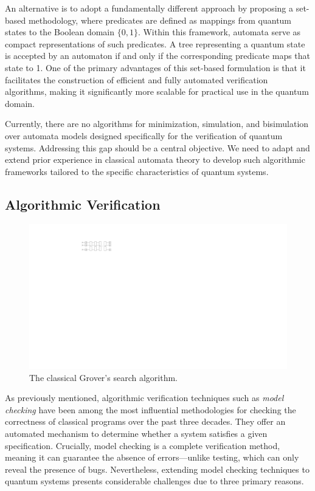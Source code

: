 An alternative is to adopt a fundamentally different approach by proposing a set-based methodology, where predicates are defined as mappings from quantum states to the Boolean domain $\{0,1\}$.
%
Within this framework, automata serve as compact representations of such predicates. A tree representing a quantum state is accepted by an automaton if and only if the corresponding predicate maps that state to 1.
%
One of the primary advantages of this set-based formulation is that it facilitates the construction of efficient and fully automated verification algorithms, making it significantly more scalable for practical use in the quantum domain.
%


Currently, there are no algorithms for minimization, simulation, and bisimulation over automata models designed specifically for the verification of quantum systems.
%
Addressing this gap should be a central objective.
%
We need to adapt and extend prior experience in classical automata theory to develop such algorithmic frameworks tailored to the specific characteristics of quantum systems.

\subsection{Algorithmic Verification}

\begin{figure}
\center
\includegraphics[scale=0.8]{Figures/Grover/Grover}
\caption{The classical Grover's search algorithm.}
\label{grover:fig}
\end{figure}
%

As previously mentioned, algorithmic verification techniques such as {\it model checking} have been among the most influential methodologies for checking the correctness of classical programs over the past three decades.
%
They offer an automated mechanism to determine whether a system satisfies a given specification.
%
Crucially, model checking is a complete verification method, meaning it can guarantee the absence of errors—unlike testing, which can only reveal the presence of bugs.
%
Nevertheless, extending model checking techniques to quantum systems presents considerable challenges due to three primary reasons.
%

